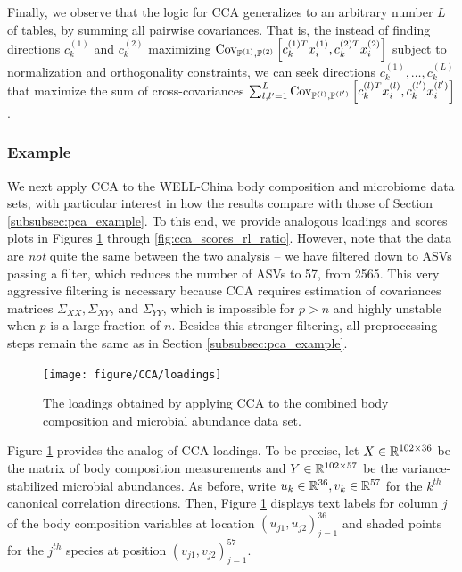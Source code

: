 \documentclass[14pt]{extarticle}
\begin{document}
Finally, we observe that the logic for CCA generalizes to an arbitrary number
$L$ of tables, by summing all pairwise covariances. That is, the instead of
finding directions $c_{k}^{(1)}$ and $c_{k}^{(2)}$ maximizing
$\mathrm{Cov}_{\mathbb{P}^{(1)}, \mathbb{P}^{(2)}}\left[{c_{k}^{(1)T}x_{i}^{(1)},
  c_{k}^{(2)T}x_{i}^{(2)}}\right]$ subject to normalization and orthogonality
constraints, we can seek directions $c_{k}^{(1)}, \dots, c_{k}^{(L)}$ that
maximize the sum of cross-covariances $\sum_{l,l^{\prime} = 1}^{L}
\mathrm{Cov}_{\mathbb{P}^{(l)}, \mathbb{P}^{(l^{\prime})}}\left[{c_{k}^{(l) T}x_{i}^{(l)},
  c_{k}^{(l^{\prime})}x_{i}^{(l^{\prime})}}\right]$.

\subsubsection{Example}
\label{subsubsec:cca_example}

We next apply CCA to the WELL-China body composition and microbiome data sets,
with particular interest in how the results compare with those of Section
\ref{subsubsec:pca_example}. To this end, we provide analogous loadings and
scores plots in Figures \ref{fig:cca_loadings} through
\ref{fig:cca_scores_rl_ratio}. However, note that the data are \textit{not}
quite the same between the two analysis -- we have filtered down to ASVs passing
a filter, which reduces the number of ASVs to 57, from 2565. This very
aggressive filtering is necessary because CCA requires estimation of covariances
matrices $\Sigma_{XX}, \Sigma_{XY}$, and $\Sigma_{YY}$, which is impossible for
$p > n$ and highly unstable when $p$ is a large fraction of $n$. Besides this
stronger filtering, all preprocessing steps remain the same as in Section
\ref{subsubsec:pca_example}.

\begin{figure}
  \centering
  \texttt{[image: figure/CCA/loadings]}
  \caption{The loadings obtained by applying CCA to the combined body
    composition and microbial abundance data set. \label{fig:cca_loadings} }
\end{figure}

Figure \ref{fig:cca_loadings} provides the analog of CCA loadings. To be
precise, let $X \in \mathbb{R}^{102\times 36}$ be the matrix of body composition
measurements and $Y \in \mathbb{R}^{102 \times 57}$ be the variance-stabilized
microbial abundances. As before, write $u_{k} \in \mathbb{R}^{36}, v_{k} \in
\mathbb{R}^{57}$ for the $k^{th}$ canonical correlation directions. Then, Figure
\ref{fig:cca_loadings} displays text labels for column $j$ of the body
composition variables at location $\left(u_{j1}, u_{j2}\right)_{j = 1}^{36}$ and
shaded points for the $j^{th}$ species at position $\left(v_{j1},
v_{j2}\right)_{j = 1}^{57}$.
\end{document}
